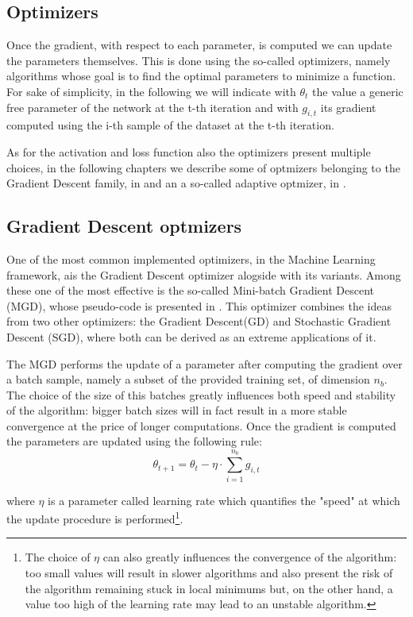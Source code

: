 \subsection{Optimizers}\label{optalg}

Once the gradient, with respect to each parameter, is computed we can update the parameters themselves. This is done using the so-called optimizers, namely algorithms whose goal is to find the optimal parameters to minimize a function.
For sake of simplicity, in the following we will indicate with $\theta_t$ the value a generic free parameter of the network at the t-th iteration and with $g_{i,t}$ its gradient computed using the i-th sample of the dataset at the t-th iteration.

As for the activation and loss function also the optimizers present multiple choices, in the following chapters we describe some of optmizers belonging to the Gradient Descent family, in  and an a so-called adaptive optmizer, in .

\subsection{Gradient Descent optmizers}
\label{opt_dg}
One of the most common implemented optimizers, in the Machine Learning framework, ais the Gradient Descent optimizer alogside with its variants\cite{var_grad}. Among these one of the most effective is the so-called Mini-batch Gradient Descent (MGD), whose pseudo-code is presented in . This optimizer combines the ideas from two other optimizers: the Gradient Descent(GD) and Stochastic Gradient Descent (SGD), where both can be derived as an extreme applications of it.

The MGD performs the update of a parameter after computing the gradient over a batch sample, namely a subset of the provided training set, of dimension $n_b$. The choice of the size of this batches greatly influences both speed and stability of the algorithm: bigger batch sizes will in fact result in a more stable convergence at the price of longer computations. Once the gradient is computed the parameters are updated using the following rule:
\begin{equation}
\theta_{t+1}=\theta_t-\eta \cdot \sum_{i=1}^{n_b} g_{i,t}
\end{equation}

where $\eta$ is a parameter called learning rate which quantifies the "speed" at which the update procedure is performed\footnote{The choice of $\eta$ can also greatly influences the convergence of the algorithm: too small values will result in slower algorithms and also present the risk of the algorithm remaining stuck in local minimums but, on the other hand, a value too high of the learning rate may lead to an unstable algorithm.}. 

